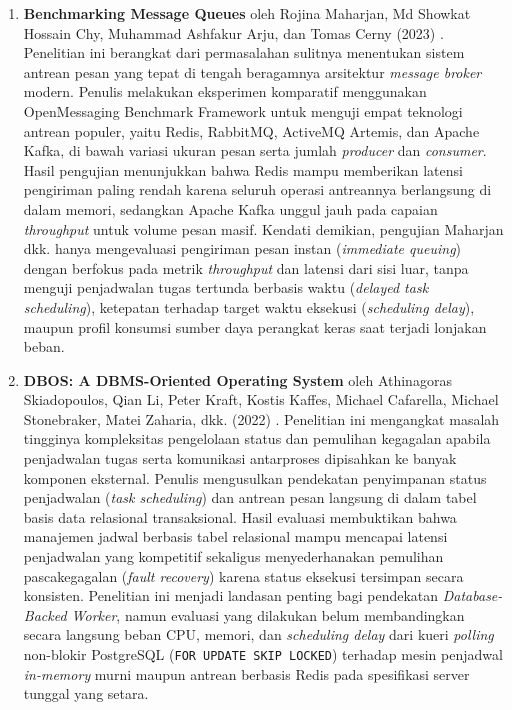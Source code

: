 \begin{enumerate}[noitemsep]
	\item \textbf{Benchmarking Message Queues} oleh Rojina Maharjan, Md Showkat Hossain Chy, Muhammad Ashfakur Arju, dan Tomas Cerny (2023) \cite{maharjan2023benchmarking}. Penelitian ini berangkat dari permasalahan sulitnya menentukan sistem antrean pesan yang tepat di tengah beragamnya arsitektur \textit{message broker} modern. Penulis melakukan eksperimen komparatif menggunakan OpenMessaging Benchmark Framework untuk menguji empat teknologi antrean populer, yaitu Redis, RabbitMQ, ActiveMQ Artemis, dan Apache Kafka, di bawah variasi ukuran pesan serta jumlah \textit{producer} dan \textit{consumer}. Hasil pengujian menunjukkan bahwa Redis mampu memberikan latensi pengiriman paling rendah karena seluruh operasi antreannya berlangsung di dalam memori, sedangkan Apache Kafka unggul jauh pada capaian \textit{throughput} untuk volume pesan masif. Kendati demikian, pengujian Maharjan dkk. hanya mengevaluasi pengiriman pesan instan (\textit{immediate queuing}) dengan berfokus pada metrik \textit{throughput} dan latensi dari sisi luar, tanpa menguji penjadwalan tugas tertunda berbasis waktu (\textit{delayed task scheduling}), ketepatan terhadap target waktu eksekusi (\textit{scheduling delay}), maupun profil konsumsi sumber daya perangkat keras saat terjadi lonjakan beban.
	\item \textbf{DBOS: A DBMS-Oriented Operating System} oleh Athinagoras Skiadopoulos, Qian Li, Peter Kraft, Kostis Kaffes, Michael Cafarella, Michael Stonebraker, Matei Zaharia, dkk. (2022) \cite{skiadopoulos2022dbos}. Penelitian ini mengangkat masalah tingginya kompleksitas pengelolaan status dan pemulihan kegagalan apabila penjadwalan tugas serta komunikasi antarproses dipisahkan ke banyak komponen eksternal. Penulis mengusulkan pendekatan penyimpanan status penjadwalan (\textit{task scheduling}) dan antrean pesan langsung di dalam tabel basis data relasional transaksional. Hasil evaluasi membuktikan bahwa manajemen jadwal berbasis tabel relasional mampu mencapai latensi penjadwalan yang kompetitif sekaligus menyederhanakan pemulihan pascakegagalan (\textit{fault recovery}) karena status eksekusi tersimpan secara konsisten. Penelitian ini menjadi landasan penting bagi pendekatan \textit{Database-Backed Worker}, namun evaluasi yang dilakukan belum membandingkan secara langsung beban CPU, memori, dan \textit{scheduling delay} dari kueri \textit{polling} non-blokir PostgreSQL (\texttt{FOR UPDATE SKIP LOCKED}) terhadap mesin penjadwal \textit{in-memory} murni maupun antrean berbasis Redis pada spesifikasi server tunggal yang setara.

\end{enumerate}
